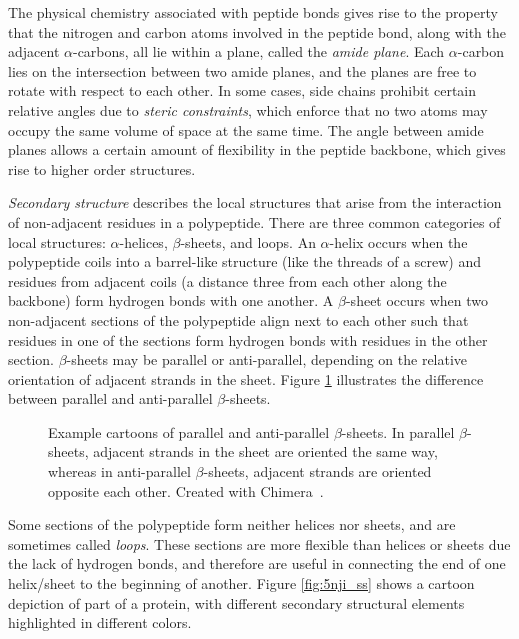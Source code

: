 The physical chemistry associated with peptide bonds gives rise to the property that the nitrogen and carbon atoms involved in the peptide bond, along with the adjacent $\alpha$-carbons, all lie within a plane, called the \textit{amide plane}.
Each $\alpha$-carbon lies on the intersection between two amide planes, and the planes are free to rotate with respect to each other. 
In some cases, side chains prohibit certain relative angles due to \textit{steric constraints}, which enforce that no two atoms may occupy the same volume of space at the same time.
The angle between amide planes allows a certain amount of flexibility in the peptide backbone, which gives rise to higher order structures.

\textit{Secondary structure} describes the local structures that arise from the interaction of non-adjacent residues in a polypeptide.
There are three common categories of local structures: $\alpha$-helices, $\beta$-sheets, and loops.
An  $\alpha$-helix occurs when the polypeptide coils into a barrel-like structure (like the threads of a screw) and residues from adjacent coils (a distance three from each other along the backbone) form hydrogen bonds with one another.
A $\beta$-sheet occurs when two non-adjacent sections of the polypeptide align next to each other such that residues in one of the sections form hydrogen bonds with residues in the other section.
$\beta$-sheets may be parallel or anti-parallel, depending on the relative orientation of adjacent strands in the sheet.
Figure \ref{fig:beta} illustrates the difference between parallel and anti-parallel $\beta$-sheets.
\begin{figure}
	\centering
	\hfill
	\caption{Example cartoons of parallel and anti-parallel $\beta$-sheets. In parallel $\beta$-sheets, adjacent strands in the sheet are oriented the same way, whereas in anti-parallel $\beta$-sheets, adjacent strands are oriented opposite each other. Created with Chimera~\cite{pettersen2004}.}
	\label{fig:beta}
\end{figure}


Some sections of the polypeptide form neither helices nor sheets, and are sometimes called \textit{loops}.
These sections are more flexible than helices or sheets due the lack of hydrogen bonds, and therefore are useful in connecting the end of one helix/sheet to the beginning of another.
Figure \ref{fig:5nji_ss} shows a cartoon depiction of part of a protein, with different secondary structural elements highlighted in different colors.
	
